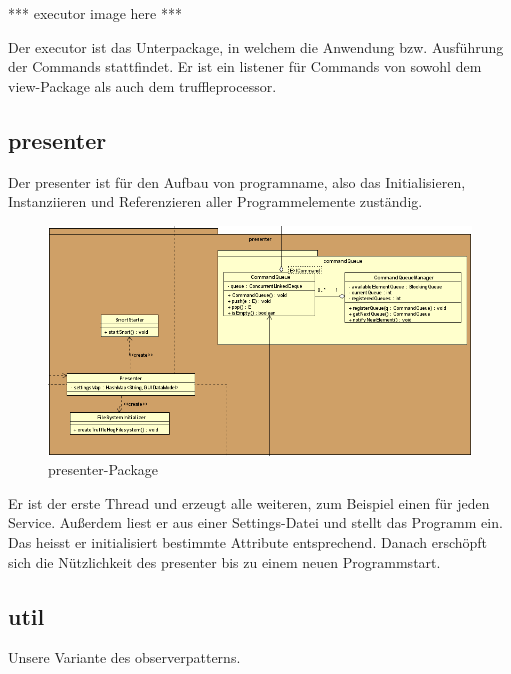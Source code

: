     *** executor image here ***
    \newline
    \newline

    Der executor ist das Unterpackage, in welchem die Anwendung bzw.
    Ausführung der Commands stattfindet. Er ist ein \gls{listener} für Commands
    von sowohl dem view-Package als auch dem truffleprocessor.


\subsection{presenter}
\label{subsec:presenter}

Der presenter ist für den Aufbau von \gls{programname}, also das
Initialisieren, Instanziieren und Referenzieren aller Programmelemente zuständig.

\begin{figure}[H]
  \centering
  \includegraphics[width=\textwidth]{../diagramimages/presenter.png}
  \caption{presenter-Package}
\end{figure}

Er ist der erste Thread und erzeugt alle weiteren, zum Beispiel einen für jeden
Service. Außerdem liest er aus einer Settings-Datei und stellt das Programm ein.
Das heisst er initialisiert bestimmte Attribute entsprechend. Danach erschöpft
sich die Nützlichkeit des presenter bis zu einem neuen Programmstart.


\subsection{util}
\label{subsec:util}


Unsere Variante des \gls{observerpattern}s.

